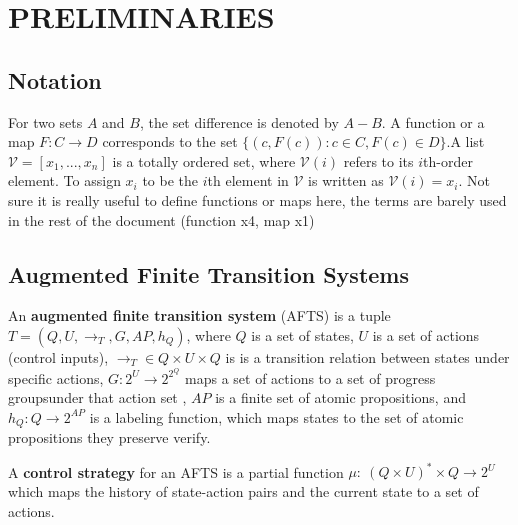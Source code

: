 \section{PRELIMINARIES}
\label{sec:pre}
\subsection{Notation}

For two sets $ A $ and $ B $, the set difference is denoted by $ A-B $. A function or a map $ F: C\rightarrow D $ {\color{purple} corresponds to  the set} $ \{(c,F(c)):c\in C, F(c)\in D \} $.{\color{teal}A list $ \mathcal{V}=[x_1,...,x_n] $ is a totally ordered set, where $ \mathcal{V}(i) $ refers to its $ i $th-order element. To assign $ x_i $ to be the $ i $th element in	 $ \mathcal{V} $ is written as $ \mathcal{V}(i) = x_i $.} {\color{purple} Not sure it is really useful to define functions or maps here, the terms are barely used in the rest of the document (function x4, map x1)} 

\subsection{Augmented Finite Transition Systems}

\begin{definition}
	An \textbf{augmented finite transition system} (AFTS) \cite{Nilsson2017} is a tuple $ T = (Q,U,\rightarrow_T, G,AP,h_Q) $, where $ Q $ is a set of states, $U$ is a set of actions (control inputs), $ \rightarrow_T\in Q\times U \times Q $ is {\color{purple} is a transition relation} between states under specific actions, $ G: 2^U\rightarrow 2^{2^Q} $ {\color{teal}maps a set of actions to a set of progress groups\footnotemark under that action set }, $ AP $ is a finite set of atomic propositions, and $ h_Q: Q\rightarrow 2^{AP} $ is a labeling function, which maps states to the set of atomic propositions they preserve {\color{purple} verify}. 
\end{definition}

\begin{definition}
	A \textbf{control strategy} for an AFTS is a partial function $ \mu:~(Q\times U)^*\times Q\rightarrow 2^U $ which maps the history of state-action pairs and the current state to a set of actions.
\end{definition}

